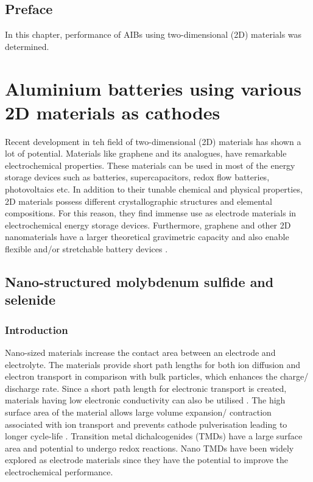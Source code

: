 \section*{Preface}
In this chapter, performance of AIBs using two-dimensional (2D) materials was determined.
\pagebreak
\chapter{Aluminium batteries using various 2D materials as cathodes} 
\label{chap6} 
Recent development in teh field of two-dimensional (2D) materials has shown a lot of potential. Materials like graphene and its analogues, have remarkable electrochemical properties. These materials can be used in most of the energy storage devices such as batteries, supercapacitors, redox flow batteries, photovoltaics etc. In addition to their tunable chemical and physical properties, 2D materials possess different crystallographic structures and elemental compositions. For this reason, they find immense use as electrode materials in electrochemical energy storage devices\cite{wang_graphene,bonaccorso}. Furthermore, graphene and other 2D nanomaterials have a larger theoretical gravimetric capacity and also enable flexible and/or stretchable battery devices \cite{zhou_progress}. 

\section{Nano-structured molybdenum sulfide and selenide}

\subsection{Introduction}
Nano-sized materials increase the contact area between an electrode and electrolyte. The materials provide short path lengths for both ion diffusion and electron transport in comparison with bulk particles, which enhances the charge/ discharge rate. Since a short path length for electronic transport is created, materials having low electronic conductivity can also be utilised \cite{pitchai_nanostructured_2011}. The high surface area of the material allows large volume expansion/ contraction associated with ion transport and prevents cathode pulverisation leading to longer cycle-life \cite{zhang_ultrathin_2015, cong_intrinsic_2015}. 
Transition metal dichalcogenides (TMDs) have a large surface area and potential to undergo redox reactions. Nano TMDs have been widely explored as electrode materials since they have the potential to improve the electrochemical performance.  

